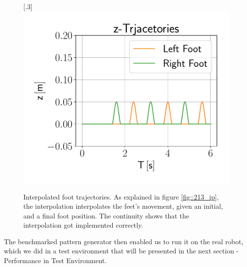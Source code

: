 \begin{figure}[h!]
	[.3\linewidth]{\includegraphics[scale=.3]{chapters/06_walking_experiments/01_user_controlled_walking/01_benchmarking/interpolated_z_trajectories.pdf}}
	\caption{Interpolated foot trajectories. As explained in figure \ref{fig::213_ip}, the interpolation interpolates the feet's movement, given an initial, and a final foot position. The continuity shows that the interpolation got implemented correctly.}
	\label{fig::411_benchmarking_inter}
\end{figure}
 The benchmarked pattern generator then enabled us to run it on the real robot, which we did in a test environment that will be presented in the next section - Performance in Test Environment.
\FloatBarrier
